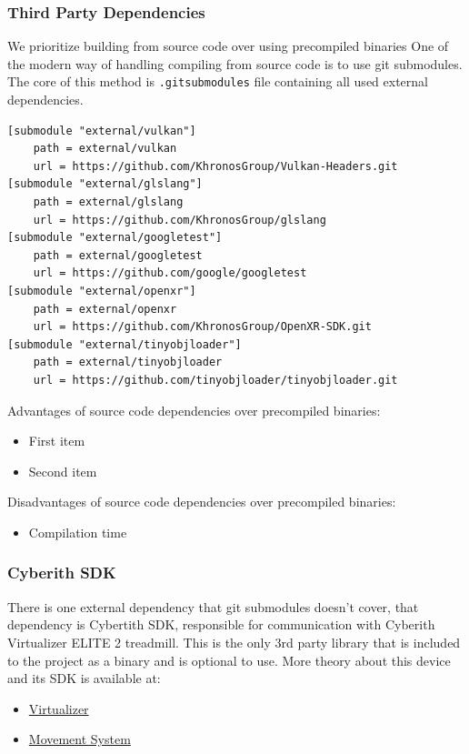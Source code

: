 \subsubsection{Third Party Dependencies}
\label{lst:3rdparty}
We prioritize building from source code over using precompiled binaries
One of the modern way of handling compiling from source code is to use git submodules. The core of this method is \texttt{.gitsubmodules} file containing all used external dependencies.
\begin{lstlisting}[caption=.gitsubmodules]
[submodule "external/vulkan"]
	path = external/vulkan
	url = https://github.com/KhronosGroup/Vulkan-Headers.git
[submodule "external/glslang"]
	path = external/glslang
	url = https://github.com/KhronosGroup/glslang
[submodule "external/googletest"]
	path = external/googletest
	url = https://github.com/google/googletest
[submodule "external/openxr"]
	path = external/openxr
	url = https://github.com/KhronosGroup/OpenXR-SDK.git
[submodule "external/tinyobjloader"]
	path = external/tinyobjloader
	url = https://github.com/tinyobjloader/tinyobjloader.git
\end{lstlisting}
Advantages of source code dependencies over precompiled binaries:
\begin{itemize}[label=$\ast$]
  \item First item
  \item Second item
\end{itemize}
Disadvantages of source code dependencies over precompiled binaries:
\begin{itemize}
    \item Compilation time 
\end{itemize}

\newpage
\subsubsection{Cyberith SDK}
There is one external dependency that git submodules doesn't cover, that dependency is Cybertith SDK, responsible for communication with Cyberith Virtualizer ELITE 2 treadmill.
This is the only 3rd party library that is included to the project as a binary and is optional to use.
More theory about this device and its SDK is available at:
\begin{itemize}
    \item \hyperref[]{Virtualizer} %
    \item \hyperref[sec:movement_system]{Movement System}
\end{itemize}

